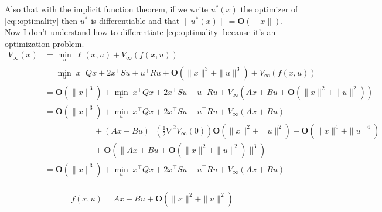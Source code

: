 \documentclass[12pt]{article}
\numberwithin{theorem}{section} %
\theoremstyle{definition}
\theoremstyle{remark}
\begin{document}
\begin{enumerate}
	Also that with the implicit function theorem, if we write $u^*(x)$ the optimizer of \ref{eq::optimality} then $u^*$ is differentiable and that $\|u^*(x)\|=\mathbf{O}(\|x\|)$.
	Now I don't understand how to differentiate \ref{eq::optimality} because it's an optimization problem.
	\begin{align*}
		V_\infty(x) &= \min_u\;\ell(x,u)+V_\infty(f(x,u))\\
		&=\min_u\; x^\top Q x + 2 x^\top S u + u^\top R u +\mathbf{O}(\|x\|^3+\|u\|^3)+ V_\infty(f(x,u))\\
		&=\mathbf{O}(\|x\|^3)+\min_u\; x^\top Q x + 2 x^\top S u + u^\top R u + V_\infty(Ax+Bu+\mathbf{O}(\|x\|^2+\|u\|^2))\\
		&=\mathbf{O}(\|x\|^3)+\min_u\; x^\top Q x + 2 x^\top S u + u^\top R u + V_\infty(Ax+Bu)\\
		&\quad\quad\quad\quad\quad\quad+(Ax+Bu)^\top\left(\frac{1}{2}\nabla^2V_\infty(0)\right)\mathbf{O}(\|x\|^2+\|u\|^2)+\mathbf{O}(\|x\|^4+\|u\|^4)\\
		&\quad\quad\quad\quad\quad\quad+\mathbf{O}(\|Ax+Bu+\mathbf{O}(\|x\|^2+\|u\|^2)\|^3)\\
		&=\mathbf{O}(\|x\|^3)+\min_u\; x^\top Q x + 2 x^\top S u + u^\top R u + V_\infty(Ax+Bu)\\
	\end{align*}


	$$f(x,u)=Ax+Bu+\mathbf{O}(\|x\|^2+\|u\|^2)$$


\end{enumerate}
\end{document}
